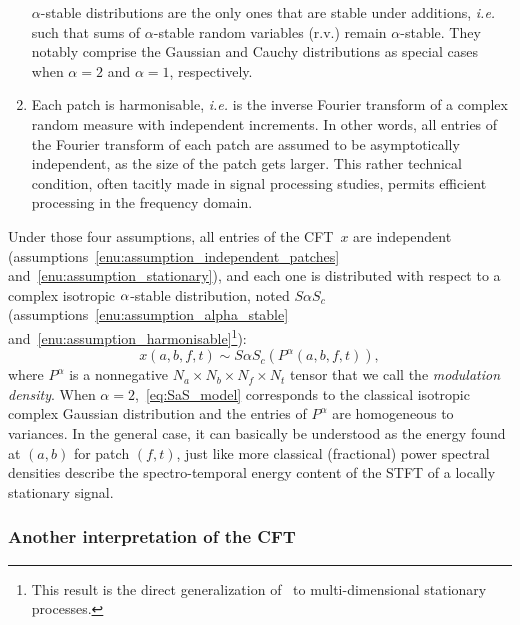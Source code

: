 \begin{enumerate}[leftmargin=0cm,itemindent=.5cm,labelwidth=\itemindent,labelsep=0cm,align=left]
$\alpha$-stable distributions are the only ones that are stable under additions, \emph{i.e.} such that
sums of $\alpha$-stable random variables (r.v.) remain $\alpha$-stable.
They notably comprise the Gaussian and Cauchy distributions as special
cases when $\alpha=2$ and $\alpha=1$, respectively.\label{enu:assumption_alpha_stable}
\item Each patch is harmonisable, \emph{i.e.} is the inverse Fourier
transform of a complex random measure with independent increments.
In other words, all entries of the Fourier transform of each patch
are assumed to be asymptotically independent, as the size of the patch
gets larger. This rather technical condition, often tacitly made in
signal processing studies, permits efficient processing in the frequency
domain.\label{enu:assumption_harmonisable}
\end{enumerate}

Under those four assumptions, all entries of the CFT~$x$ are independent
(assumptions~\ref{enu:assumption_independent_patches} and~\ref{enu:assumption_stationary}),
and each one is distributed with respect to a complex isotropic $\text{\ensuremath{\alpha}}$-stable
distribution, noted $S\alpha S_{c}$ (assumptions~\ref{enu:assumption_alpha_stable}
and~\ref{enu:assumption_harmonisable}\footnote{This result is the direct generalization
of~\cite[th. 6.5.1]{samoradnitsky1994stable} to multi-dimensional stationary processes.}):
\begin{equation}
x\left(a,b,f,t\right)\sim S\alpha S_{c}\left(P^{\alpha}\left(a,b,f,t\right)\right),\label{eq:SaS_model}
\end{equation}
where $P^{\alpha}$ is a nonnegative $N_{a}\times N_{b}\times N_{f}\times N_{t}$
tensor that we call the \emph{modulation density}. When $\alpha=2$,~\eqref{eq:SaS_model}
corresponds to the classical isotropic complex Gaussian distribution
and the entries of $P^{\alpha}$ are homogeneous to variances. In
the general case, it can basically be understood as the energy found at $\left(a,b\right)$ for patch
$\left(f,t\right)$, just like more classical (fractional) power spectral
densities describe the spectro-temporal energy content of the STFT
of a locally stationary signal.

\subsubsection{Another interpretation of the CFT}

\label{sub:interpretation}

